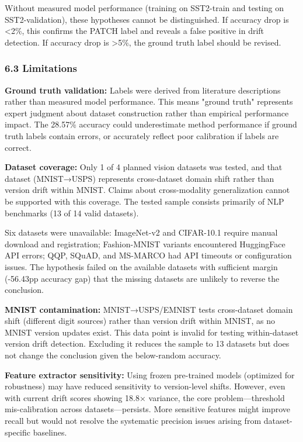 Without measured model performance (training on SST2-train and testing on SST2-validation), these hypotheses cannot be distinguished. If accuracy drop is <2\%, this confirms the PATCH label and reveals a false positive in drift detection. If accuracy drop is >5\%, the ground truth label should be revised.

\subsubsection{6.3 Limitations}

\textbf{Ground truth validation:} Labels were derived from literature descriptions rather than measured model performance. This means "ground truth" represents expert judgment about dataset construction rather than empirical performance impact. The 28.57\% accuracy could underestimate method performance if ground truth labels contain errors, or accurately reflect poor calibration if labels are correct.

\textbf{Dataset coverage:} Only 1 of 4 planned vision datasets was tested, and that dataset (MNIST→USPS) represents cross-dataset domain shift rather than version drift within MNIST. Claims about cross-modality generalization cannot be supported with this coverage. The tested sample consists primarily of NLP benchmarks (13 of 14 valid datasets).

Six datasets were unavailable: ImageNet-v2 and CIFAR-10.1 require manual download and registration; Fashion-MNIST variants encountered HuggingFace API errors; QQP, SQuAD, and MS-MARCO had API timeouts or configuration issues. The hypothesis failed on the available datasets with sufficient margin (-56.43pp accuracy gap) that the missing datasets are unlikely to reverse the conclusion.

\textbf{MNIST contamination:} MNIST→USPS/EMNIST tests cross-dataset domain shift (different digit sources) rather than version drift within MNIST, as no MNIST version updates exist. This data point is invalid for testing within-dataset version drift detection. Excluding it reduces the sample to 13 datasets but does not change the conclusion given the below-random accuracy.

\textbf{Feature extractor sensitivity:} Using frozen pre-trained models (optimized for robustness) may have reduced sensitivity to version-level shifts. However, even with current drift scores showing 18.8× variance, the core problem—threshold mis-calibration across datasets—persists. More sensitive features might improve recall but would not resolve the systematic precision issues arising from dataset-specific baselines.

